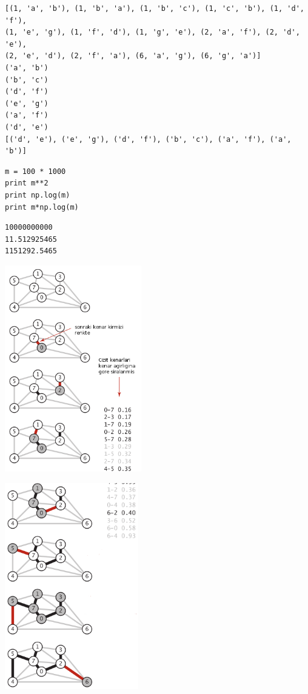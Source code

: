 \documentclass[12pt,fleqn]{article}\usepackage{../common}
\begin{document}
\begin{verbatim}
[(1, 'a', 'b'), (1, 'b', 'a'), (1, 'b', 'c'), (1, 'c', 'b'), (1, 'd', 'f'),
(1, 'e', 'g'), (1, 'f', 'd'), (1, 'g', 'e'), (2, 'a', 'f'), (2, 'd', 'e'),
(2, 'e', 'd'), (2, 'f', 'a'), (6, 'a', 'g'), (6, 'g', 'a')] 
('a', 'b')
('b', 'c')
('d', 'f')
('e', 'g')
('a', 'f')
('d', 'e')
[('d', 'e'), ('e', 'g'), ('d', 'f'), ('b', 'c'), ('a', 'f'), ('a', 'b')]
\end{verbatim}

\begin{verbatim}
m = 100 * 1000
print m**2
print np.log(m)
print m*np.log(m)
\end{verbatim}

\begin{verbatim}
10000000000
11.512925465
1151292.5465
\end{verbatim}


\includegraphics[height=9cm]{sedge_krus_1.png}

\includegraphics[height=9cm]{sedge_krus_2.png}
\end{document}
